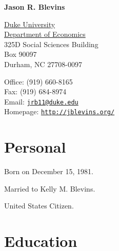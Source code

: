 \documentclass[letterpaper]{article}
\renewenvironment{itemize}{
  \begin{list}{}{
    \setlength{\leftmargin}{1em}
  }
}{
  \end{list}
}
\begin{document}
{\huge\bf Jason R. Blevins}

\vspace{0.25in}

\begin{minipage}{0.5\textwidth}
  \href{http://www.duke.edu/}{Duke University} \\
  \href{http://www.econ.duke.edu/}{Department of Economics} \\
  325D Social Sciences Building \\
  Box 90097 \\
  Durham, NC 27708-0097
\end{minipage}
\begin{minipage}{0.5\textwidth}
  Office: (919) 660-8165 \\
  Fax: (919) 684-8974 \\
  Email: \href{mailto:jrb11@duke.edu}{\tt jrb11@duke.edu} \\
  Homepage: \href{http://jblevins.org/}{\tt http://jblevins.org/} \\
\end{minipage}

\section*{Personal}

\begin{itemize}
\item Born on December 15, 1981.
\item Married to Kelly M. Blevins.
\item United States Citizen.
\end{itemize}


\section*{Education}
\end{document}
